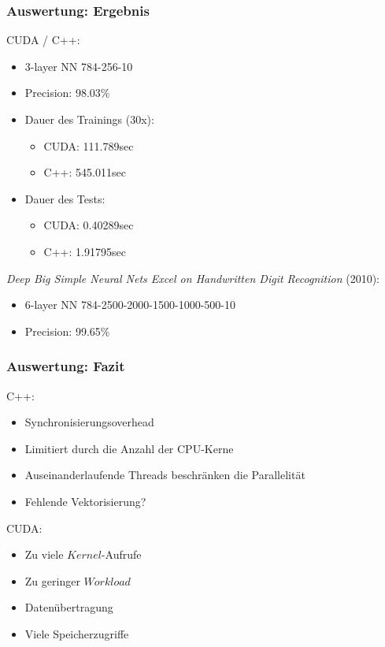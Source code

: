 \documentclass[xcolor=pdftex,dvipsnames,table]{beamer}
\begin{document}
\begin{frame}
	\frametitle{Auswertung: Ergebnis}
	CUDA / C++:
	\begin{itemize}
		\item 3-layer NN 784-256-10
		\item Precision: 98.03\%
		
		\item Dauer des Trainings (30x):
			\begin{itemize}
				\item CUDA: 111.789sec
				\item C++: 545.011sec
			\end{itemize}
		\item Dauer des Tests:
			\begin{itemize}
				\item CUDA: 0.40289sec
				\item C++: 1.91795sec
			\end{itemize}		
		
	\end{itemize}
	
	\textit{Deep Big Simple Neural Nets Excel on Handwritten Digit Recognition} (2010):
	\begin{itemize}
		\item 6-layer NN 784-2500-2000-1500-1000-500-10
		\item Precision: 99.65\%
	\end{itemize}
\end{frame}


\begin{frame}
	\frametitle{Auswertung: Fazit}
		C++:
		\begin{itemize}
			\item Synchronisierungsoverhead 
			\item Limitiert durch die Anzahl der CPU-Kerne
			\item Auseinanderlaufende Threads beschränken die Parallelität
			\item Fehlende Vektorisierung?
		\end{itemize}
	
	
		CUDA:
		\begin{itemize}
			\item Zu viele $Kernel$-Aufrufe
			\item Zu geringer $Workload$
			\item Datenübertragung		
			\item Viele Speicherzugriffe
		\end{itemize}
\end{frame}
\end{document}
